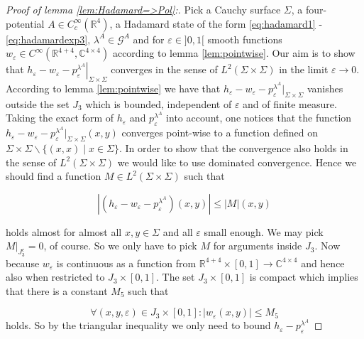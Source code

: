 \documentclass[b5paper,draft,openbib,12pt]{memoir}
\begin{document}
  

\begin{proof}[Proof of lemma \ref{lem:Hadamard=>Pol}:]


Pick a Cauchy surface \(\Sigma\), a four-potential \(A \in C_c^\infty(\mathbb{R}^4)\), a Hadamard state of the form 
  \eqref{eq:hadamard1} -\eqref{eq:hadamardexp3}, \(\lambda^A\in\mathcal{G}^A\)
  and for \(\varepsilon \in]0,1[\) smooth functions \(w_\varepsilon \in C^\infty(\mathbb{R}^{4+4},\mathbb{C}^{4\times 4})\)
  according to lemma \ref{lem:pointwise}. 
Our aim is to show that 
\(\left.h_\varepsilon - w_\varepsilon -p_\varepsilon^{\lambda^A} \right|_{\Sigma\times\Sigma}\) converges in the 
sense of \(L^2(\Sigma\times\Sigma)\) in the limit \(\varepsilon\rightarrow 0\).
According to lemma \ref{lem:pointwise} we have that
  \(h_\varepsilon-w_\varepsilon-p^{\lambda^A}_{\varepsilon}|_{\Sigma\times \Sigma}\) vanishes 
  outside the set \(J_3\) which is bounded, independent of \(\varepsilon\) and of finite measure. 
  Taking the exact form of \(h_\varepsilon\) and \(p^{\lambda^A}_\varepsilon\) into account,
  one notices that the function \(h_\varepsilon-w_\varepsilon-p^{\lambda^A}_{\varepsilon}|_{\Sigma\times \Sigma} (x,y)\) converges point-wise to a function defined
  on \(\Sigma\times\Sigma \backslash \{(x,x)\mid x\in \Sigma\}\). In order to show that the convergence also holds in the sense of \(L^2(\Sigma\times\Sigma)\) we
  would like to use dominated convergence. Hence we should find a function \(M\in L^2(\Sigma\times\Sigma)\) such that 
  

\begin{equation}\label{eq: def bound}
\left|  (h_\varepsilon-w_\varepsilon-p^{\lambda^A}_{\varepsilon})(x,y)\right|\le |M|(x,y)
\end{equation}
  
  holds almost for almost all \(x,y\in\Sigma\) and all \(\varepsilon\) small enough. We may pick \(\left. M\right|_{J_3^c}=0\), of course. 
So we only have to pick \(M\) for arguments inside \(J_3\). Now because \(w_\varepsilon\) is continuous as a function from 
\(\mathbb{R}^{4+4}\times [0,1]\rightarrow \mathbb{C}^{4\times 4}\) and hence also when restricted to \(J_3\times[0,1]\). The 
set \(J_3\times[0,1]\) is compact which implies that there is a constant \(M_5\) such that

\begin{equation}
\forall (x,y,\varepsilon)\in J_3\times[0,1]: |w_\varepsilon(x,y)|\le M_5
\end{equation}
holds. So by the triangular inequality we only need to bound \(h_\varepsilon-p_\varepsilon^{\lambda^A}\)


\end{proof}
\end{document}
